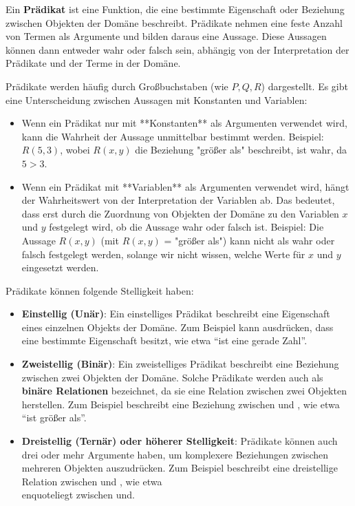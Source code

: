 \documentclass[main.tex]{subfiles}
\begin{document}
\begin{definition}[Prädikat]
Ein \textbf{Prädikat} ist eine Funktion, die eine bestimmte Eigenschaft oder Beziehung zwischen Objekten der Domäne beschreibt. Prädikate nehmen eine feste Anzahl von Termen als Argumente und bilden daraus eine Aussage. Diese Aussagen können dann entweder wahr oder falsch sein, abhängig von der Interpretation der Prädikate und der Terme in der Domäne.

Prädikate werden häufig durch Großbuchstaben (wie \(P, Q, R\)) dargestellt. Es gibt eine Unterscheidung zwischen Aussagen mit Konstanten und Variablen:

\begin{itemize}
    \item Wenn ein Prädikat nur mit **Konstanten** als Argumenten verwendet wird, kann die Wahrheit der Aussage unmittelbar bestimmt werden. Beispiel: \(R(5, 3)\), wobei \(R(x, y)\) die Beziehung "größer als" beschreibt, ist wahr, da \(5 > 3\).
    
    \item Wenn ein Prädikat mit **Variablen** als Argumenten verwendet wird, hängt der Wahrheitswert von der Interpretation der Variablen ab. Das bedeutet, dass erst durch die Zuordnung von Objekten der Domäne zu den Variablen \(x\) und \(y\) festgelegt wird, ob die Aussage wahr oder falsch ist. Beispiel: Die Aussage \(R(x, y)\) (mit \(R(x, y)\) = "größer als") kann nicht als wahr oder falsch festgelegt werden, solange wir nicht wissen, welche Werte für \(x\) und \(y\) eingesetzt werden.
\end{itemize}

Prädikate können folgende Stelligkeit haben:
\begin{itemize}
\item 	\textbf{Einstellig (Unär)}: Ein einstelliges Prädikat beschreibt eine Eigenschaft eines einzelnen Objekts der Domäne. Zum Beispiel kann  ausdrücken, dass  eine bestimmte Eigenschaft besitzt, wie etwa \enquote{ist eine gerade Zahl}.
\item 	\textbf{Zweistellig (Binär)}: Ein zweistelliges Prädikat beschreibt eine Beziehung zwischen zwei Objekten der Domäne. Solche Prädikate werden auch als \textbf{binäre Relationen} bezeichnet, da sie eine Relation zwischen zwei Objekten herstellen. Zum Beispiel beschreibt  eine Beziehung zwischen  und , wie etwa \enquote{ist größer als}.

\item 	\textbf{Dreistellig (Ternär) oder höherer Stelligkeit}: Prädikate können auch drei oder mehr Argumente haben, um komplexere Beziehungen zwischen mehreren Objekten auszudrücken. Zum Beispiel beschreibt  eine dreistellige Relation zwischen  und , wie etwa \\enquote{liegt zwischen  und}.
\end{itemize}


\end{definition}
\end{document}
